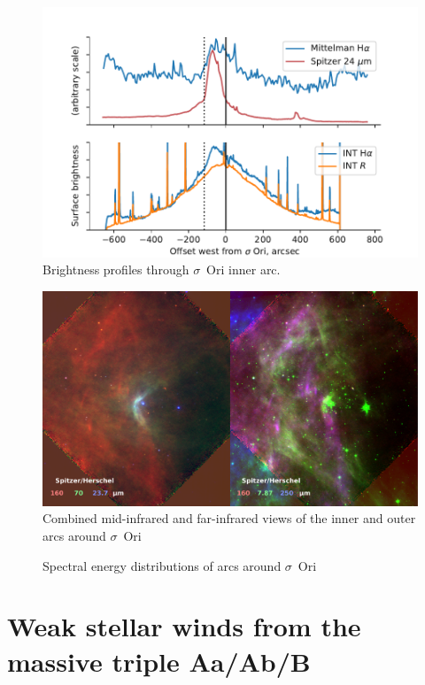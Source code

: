 \documentclass[useAMS, usenatbib, a4paper]{mnras}
\begin{document}
\begin{figure}
  \centering
  \includegraphics[width=\linewidth]{figs/sigma-ori-eastwest-cuts}
  \caption{Brightness profiles through $\sigma$~Ori inner arc.}
  \label{fig:sig-ori-cuts}
\end{figure}

\begin{figure}
  \centering
  \includegraphics[width=\linewidth]{figs/sigma-ori-inner-outer}
  \caption{Combined mid-infrared and far-infrared views of the inner and outer arcs around $\sigma$~Ori}
  \label{fig:sig-ori-outer}
\end{figure}

\begin{figure}
  \centering
  \caption{Spectral energy distributions of arcs around $\sigma$~Ori}
  \label{fig:sig-ori-SED}
\end{figure}



\section{Weak stellar winds from the massive triple Aa/Ab/B}
\label{sec:stellar-winds-AB}
\end{document}
